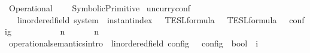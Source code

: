 %
\begin{isabellebody}%
%
%
\isadelimdocument
%
\endisadelimdocument
%
\isatagdocument
%
\isamarkuptrue%
%
\endisatagdocument
{\isafolddocument}%
%
\isadelimdocument
%
\endisadelimdocument
%
\begin{isamarkuptext}%
\label{chap:operational_semantics}%
\end{isamarkuptext}\isamarkuptrue%
%
\isadelimtheory
%
\endisadelimtheory
%
\isatagtheory
{}\isamarkupfalse%
\ Operational\isanewline
{}\isanewline
\ \ \ \ {\isachardoublequoteopen}SymbolicPrimitive{\isachardoublequoteclose}\isanewline
\isanewline
{}%
\endisatagtheory
{\isafoldtheory}%
%
\isadelimtheory
%
\endisadelimtheory
%
\isadelimdocument
%
\endisadelimdocument
%
\isatagdocument
%
\isamarkuptrue%
%
\endisatagdocument
{\isafolddocument}%
%
\isadelimdocument
%
\endisadelimdocument
{}\isamarkupfalse%
\ uncurry{\isacharunderscore}conf\isanewline
\ \ {\isacharcolon}{\isacharcolon}\ {\isachardoublequoteopen}{\isacharparenleft}{\isacharprime}{\isasymtau}{\isacharcolon}{\isacharcolon}linordered{\isacharunderscore}field{\isacharparenright}\ system\ {\isasymRightarrow}\ instant{\isacharunderscore}index\ {\isasymRightarrow}\ {\isacharprime}{\isasymtau}\ TESL{\isacharunderscore}formula\ {\isasymRightarrow}\ {\isacharprime}{\isasymtau}\ TESL{\isacharunderscore}formula\ {\isasymRightarrow}\ {\isacharprime}{\isasymtau}\ config{\isachardoublequoteclose}\ {\isacharparenleft}{\isachardoublequoteopen}{\isacharunderscore}{\isacharcomma}\ {\isacharunderscore}\ {\isasymturnstile}\ {\isacharunderscore}\ {\isasymtriangleright}\ {\isacharunderscore}{\isachardoublequoteclose}\ {}{}{\isacharparenright}\ \isanewline
\ \ {\isachardoublequoteopen}{\isasymGamma}{\isacharcomma}\ n\ {\isasymturnstile}\ {\isasymPsi}\ {\isasymtriangleright}\ {\isasymPhi}\ {\isasymequiv}\ {\isacharparenleft}{\isasymGamma}{\isacharcomma}\ n{\isacharcomma}\ {\isasymPsi}{\isacharcomma}\ {\isasymPhi}{\isacharparenright}{\isachardoublequoteclose}\isanewline
\isanewline
{}\isamarkupfalse%
\ operational{\isacharunderscore}semantics{\isacharunderscore}intro\ {\isacharcolon}{\isacharcolon}\ {\isachardoublequoteopen}{\isacharparenleft}{\isacharprime}{\isasymtau}{\isacharcolon}{\isacharcolon}linordered{\isacharunderscore}field{\isacharparenright}\ config\ {\isasymRightarrow}\ {\isacharprime}{\isasymtau}\ config\ {\isasymRightarrow}\ bool{\isachardoublequoteclose}\ {\isacharparenleft}{\isachardoublequoteopen}{\isacharunderscore}\ {\isasymhookrightarrow}\isactrlsub i\ {\isacharunderscore}{\isachardoublequoteclose}\ {}{}{\isacharparenright}\ \isanewline

\end{isabellebody}
